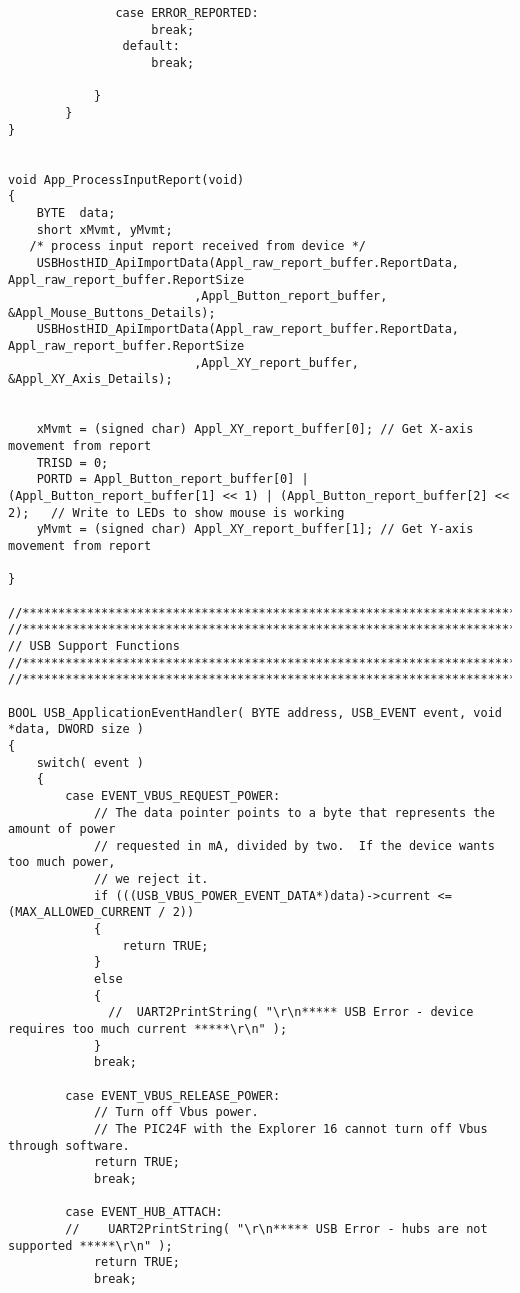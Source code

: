 \documentclass{article}
\begin{document}
\begin{verbatim}
               case ERROR_REPORTED:
                    break;
                default:
                    break;

            }
        }
}


void App_ProcessInputReport(void)
{
    BYTE  data;
	short xMvmt, yMvmt;
   /* process input report received from device */
    USBHostHID_ApiImportData(Appl_raw_report_buffer.ReportData, Appl_raw_report_buffer.ReportSize
                          ,Appl_Button_report_buffer, &Appl_Mouse_Buttons_Details);
    USBHostHID_ApiImportData(Appl_raw_report_buffer.ReportData, Appl_raw_report_buffer.ReportSize
                          ,Appl_XY_report_buffer, &Appl_XY_Axis_Details);

    
    xMvmt = (signed char) Appl_XY_report_buffer[0];	// Get X-axis movement from report
    TRISD = 0;
	PORTD = Appl_Button_report_buffer[0] | (Appl_Button_report_buffer[1] << 1) | (Appl_Button_report_buffer[2] << 2);	// Write to LEDs to show mouse is working
    yMvmt = (signed char) Appl_XY_report_buffer[1];	// Get Y-axis movement from report
    
}

//******************************************************************************
//******************************************************************************
// USB Support Functions
//******************************************************************************
//******************************************************************************

BOOL USB_ApplicationEventHandler( BYTE address, USB_EVENT event, void *data, DWORD size )
{
    switch( event )
    {
        case EVENT_VBUS_REQUEST_POWER:
            // The data pointer points to a byte that represents the amount of power
            // requested in mA, divided by two.  If the device wants too much power,
            // we reject it.
            if (((USB_VBUS_POWER_EVENT_DATA*)data)->current <= (MAX_ALLOWED_CURRENT / 2))
            {
                return TRUE;
            }
            else
            {
              //  UART2PrintString( "\r\n***** USB Error - device requires too much current *****\r\n" );
            }
            break;

        case EVENT_VBUS_RELEASE_POWER:
            // Turn off Vbus power.
            // The PIC24F with the Explorer 16 cannot turn off Vbus through software.
            return TRUE;
            break;

        case EVENT_HUB_ATTACH:
        //    UART2PrintString( "\r\n***** USB Error - hubs are not supported *****\r\n" );
            return TRUE;
            break;


\end{verbatim}
\end{document}
